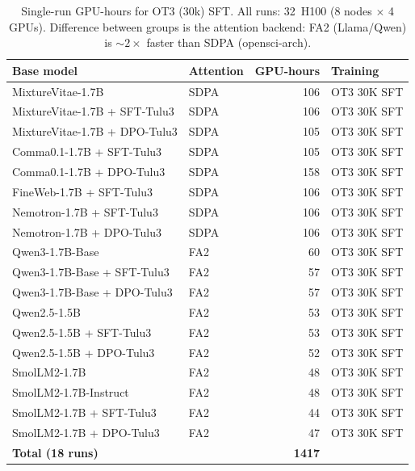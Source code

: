 \begin{table}[htbp]
\centering
\caption{Single-run GPU-hours for OT3 (30k) SFT.
All runs: 32~H100 (8 nodes $\times$ 4 GPUs). Difference between groups
is the attention backend: FA2 (Llama/Qwen) is ${\sim}2\times$ faster than SDPA (opensci-arch).}
\label{tab:ot30k_sft_gpu_hours}
\begin{tabular}{llrl}
\toprule
Base model & Attention & GPU-hours & Training \\
\midrule
MixtureVitae-1.7B                & SDPA & 106 & OT3 30K SFT \\
MixtureVitae-1.7B + SFT-Tulu3    & SDPA & 106 & OT3 30K SFT \\
MixtureVitae-1.7B + DPO-Tulu3    & SDPA & 105 & OT3 30K SFT \\
Comma0.1-1.7B + SFT-Tulu3        & SDPA & 105 & OT3 30K SFT \\
Comma0.1-1.7B + DPO-Tulu3        & SDPA & 158 & OT3 30K SFT \\
FineWeb-1.7B + SFT-Tulu3   & SDPA & 106 & OT3 30K SFT \\
Nemotron-1.7B + SFT-Tulu3  & SDPA & 106 & OT3 30K SFT \\
Nemotron-1.7B + DPO-Tulu3  & SDPA & 106 & OT3 30K SFT \\
\addlinespace
Qwen3-1.7B-Base                  & FA2  & 60  & OT3 30K SFT \\
Qwen3-1.7B-Base + SFT-Tulu3      & FA2  & 57  & OT3 30K SFT \\
Qwen3-1.7B-Base + DPO-Tulu3      & FA2  & 57  & OT3 30K SFT \\
Qwen2.5-1.5B                     & FA2  & 53  & OT3 30K SFT \\
Qwen2.5-1.5B + SFT-Tulu3         & FA2  & 53  & OT3 30K SFT \\
Qwen2.5-1.5B + DPO-Tulu3         & FA2  & 52  & OT3 30K SFT \\
SmolLM2-1.7B                     & FA2  & 48  & OT3 30K SFT \\
SmolLM2-1.7B-Instruct            & FA2  & 48  & OT3 30K SFT \\
SmolLM2-1.7B + SFT-Tulu3         & FA2  & 44  & OT3 30K SFT \\
SmolLM2-1.7B + DPO-Tulu3         & FA2  & 47  & OT3 30K SFT \\
\midrule
\textbf{Total (18 runs)}         &      & \textbf{1417} & \\
\bottomrule
\end{tabular}
\end{table}

